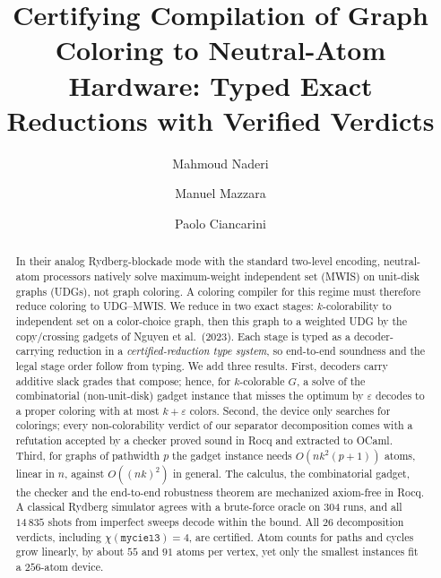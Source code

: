 \documentclass[a4paper,fleqn]{cas-sc}
\begin{document}
\let\WriteBookmarks\relax
\def\floatpagepagefraction{1}
\def\textpagefraction{.001}


\title[mode=title]{Certifying Compilation of Graph Coloring to Neutral-Atom
Hardware: Typed Exact Reductions with Verified Verdicts}

\author[1]{Mahmoud Naderi}
\cormark[1]

\author[2]{Manuel Mazzara}

\author[3]{Paolo Ciancarini}


\begin{abstract}
In their analog Rydberg-blockade mode with the standard two-level encoding,
neutral-atom processors natively solve maximum-weight independent set (MWIS) on
unit-disk graphs (UDGs), not graph coloring. A coloring compiler for this regime must
therefore reduce coloring to UDG--MWIS. We reduce in two exact stages:
$k$-colorability to independent set on a color-choice graph, then this graph to a
weighted UDG by the copy/crossing gadgets of Nguyen et al.\ (2023). Each
stage is typed as a decoder-carrying reduction in a \emph{certified-reduction type
system}, so end-to-end soundness and the legal stage order follow from typing. We
add three results. First, decoders carry additive slack grades that compose; hence,
for $k$-colorable $G$, a solve of the combinatorial (non-unit-disk) gadget instance
that misses the optimum by $\varepsilon$ decodes to a proper coloring with at most
$k+\varepsilon$ colors. Second, the device only searches for colorings; every
non-colorability verdict of our separator decomposition comes with a refutation
accepted by a checker proved sound in Rocq and extracted to OCaml. Third, for graphs
of pathwidth $p$ the gadget instance needs $O(nk^2(p+1))$ atoms, linear in $n$,
against $O((nk)^2)$ in general. The calculus, the combinatorial gadget, the
checker and the end-to-end robustness theorem are mechanized axiom-free in Rocq. A
classical Rydberg simulator agrees with a brute-force oracle on $304$ runs, and all
$14\,835$ shots from imperfect sweeps decode within the bound.
All $26$ decomposition verdicts, including $\chi(\texttt{myciel3})=4$, are
certified. Atom counts for paths and cycles grow linearly, by about $55$ and $91$
atoms per vertex, yet only the smallest instances fit a $256$-atom device.
\end{abstract}
\end{document}
